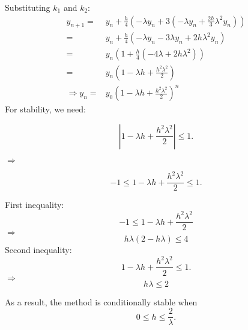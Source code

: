 \documentclass{article}
\begin{document}
Substituting \( k_1 \) and \( k_2 \):
\begin{align*}
    y_{n+1} =        & y_n + \frac{h}{4} \left( -\lambda y_n + 3 \left(-\lambda y_n + \frac{2h}{3} \lambda^2 y_n \right) \right) \\
    =                & y_n + \frac{h}{4} \left( -\lambda y_n - 3\lambda y_n + 2h \lambda^2 y_n \right)                           \\
    =                & y_n \left( 1 + \frac{h}{4} (-4\lambda + 2h \lambda^2) \right)                                             \\
    =                & y_n \left( 1 - \lambda h + \frac{h^2\lambda^2}{2} \right)                                                 \\
    \Rightarrow y_n= & y_0 \left( 1 - \lambda h + \frac{h^2\lambda^2}{2} \right)^n
\end{align*}
For stability, we need:

$$
    \left| 1 - \lambda h + \frac{h^2\lambda^2}{2} \right| \leq 1.
$$

$\Rightarrow$

$$
    -1 \leq 1 - \lambda h + \frac{h^2\lambda^2}{2} \leq 1.
$$

First inequality:
$$
    -1 \leq 1 - \lambda h + \frac{h^2\lambda^2}{2}
$$
$\Rightarrow$
$$
    h\lambda(2-h\lambda)\leq4
$$
Second inequality:
$$
    1 - \lambda h + \frac{h^2\lambda^2}{2} \leq 1.
$$
$\Rightarrow$
$$
    h\lambda \leq2
$$

As a result, the method is conditionally stable when
\[
    \boxed{0 \leq h \leq \dfrac{2}{\lambda}}.
\]
\end{document}
